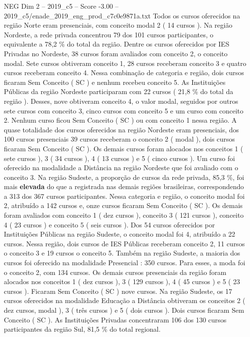 \begin{textsample}{NEG Dim 2 – 2019\_c5 – Score -3.00 – 2019\_c5/enade\_2019\_eng\_prod\_c7c0e9871a.txt}
Todos os cursos oferecidos na região Norte eram presenciais, com conceito modal 2 ( 14 cursos ).
Na região Nordeste, a rede privada concentrou 79 dos 101 cursos participantes, o equivalente a 78,2 \% do total da região.
Dentre os cursos oferecidos por IES Privadas no Nordeste, 38 cursos foram avaliados com conceito 2, o conceito modal.
Sete cursos obtiveram conceito 1, 28 cursos receberam conceito 3 e quatro cursos receberam conceito 4.
Nessa combinação de categoria e região, dois cursos ficaram Sem Conceito ( SC ) e nenhum recebeu conceito 5.
As Instituições Públicas da região Nordeste participaram com 22 cursos ( 21,8 \% do total da região ).
Desses, nove obtiveram conceito 4, o valor modal, seguidos por outros sete cursos com conceito 3, cinco cursos com conceito 5 e um curso com conceito 2.
Nenhum curso ficou Sem Conceito ( SC ) ou com conceito 1 nessa região.
A quase totalidade dos cursos oferecidos na região Nordeste eram presenciais, dos 100 cursos presenciais 39 cursos receberam o conceito 2 ( modal ), dois cursos ficaram Sem Conceito ( SC ).
Os demais cursos foram alocados nos conceitos 1 ( sete cursos ), 3 ( 34 cursos ), 4 ( 13 cursos ) e 5 ( cinco cursos ).
Um curso foi oferecido na modalidade a Distância na região Nordeste que foi avaliado com o conceito 3.
Na região Sudeste, a proporção de cursos da rede privada, 85,3 \%, foi mais \textbf{elevada} do que a registrada nas demais regiões brasileiras, correspondendo a 313 dos 367 cursos participantes.
Nessa categoria e região, o conceito modal foi 2, atribuído a 142 cursos e, onze cursos ficaram Sem Conceito ( SC ).
Os demais foram avaliados com conceito 1 ( dez cursos ), conceito 3 ( 121 cursos ), conceito 4 ( 23 cursos ) e conceito 5 ( seis cursos ).
Dos 54 cursos oferecidos por Instituições Públicas na região Sudeste, o conceito modal foi 4, atribuído a 22 cursos.
Nessa região, dois cursos de IES Públicas receberam conceito 2, 11 cursos o conceito 3 e 19 cursos o conceito 5.
Também na região Sudeste, a maioria dos cursos foi oferecido na modalidade Presencial : 350 cursos.
Para esses, a moda foi o conceito 2, com 134 cursos.
Os demais cursos presenciais da região foram alocados nos conceitos 1 ( dez cursos ), 3 ( 129 cursos ), 4 ( 45 cursos ) e 5 ( 23 cursos ).
Ficaram Sem Conceito ( SC ) nove cursos.
Na região Sudeste, os 17 cursos oferecidos na modalidade Educação a Distância obtiveram os conceitos 2 ( dez cursos, modal ), 3 ( três cursos ) e 5 ( dois cursos ).
Dois cursos ficaram Sem Conceito ( SC ).
As Instituições Privadas concentraram 106 dos 130 cursos participantes da região Sul, 81,5 \% do total regional.

\end{textsample}
